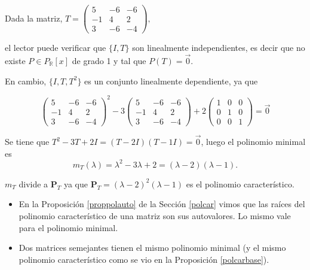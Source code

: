 \bigskip 

\begin{example}

\bigskip 

Dada la matriz, $T=\left(\begin{array}{ccc} 5 & -6 & -6  \\-1  & 4 & 2
\\ 3  & -6 & -4
\end{array}
 \right),$ 
 
 \bigskip 
\noindent
 el lector  puede verificar que $\{I,T\}$ son  linealmente independientes, es decir que  no existe $P\in P_\mathbb{R}\left[x\right]$ de grado 1 y tal que $P(T)=\vec{0}$.
 
  \bigskip 
 
En cambio,  $\{I,T, T^2\}$ es un conjunto linealmente dependiente, ya que 


\begin{equation}
 \left(\begin{array}{ccc} 5 & -6 & -6  \\-1  & 4 & 2
\\ 3  & -6 & -4
\end{array}
 \right) ^2- 3\left(\begin{array}{ccc} 5 & -6 & -6  \\-1  & 4 & 2 \\ 3  & -6 & -4
\end{array}
 \right)+ 2 \left(\begin{array}{ccc} 1 & 0 & 0  \\0  & 1 & 0
\\ 0  & 0 & 1
\end{array}
 \right)=\vec{0}
  \end{equation}
\bigskip  
  

Se tiene que $T^2-3T+2I= (T-2I)(T-1I)=\vec{0}$, luego el polinomio minimal es  $$m_T(\lambda)= \lambda^2-3\lambda+2=(\lambda-2)(\lambda-1).$$

 \noindent
$m_T$  divide a $ \mathbf{P}_T$ ya que    $\mathbf{P}_T=(\lambda-2)^2 (\lambda-1)$ es el polinomio característico.


\end{example}

\bigskip

\begin{remark}
\begin{itemize}

\item
En la Proposición \ref {proppolauto} de la Sección \ref{polcar} vimos que las raíces del polinomio característico de una matriz son sus autovalores. Lo mismo vale para el polinomio minimal.
\item
Dos matrices semejantes tienen el mismo polinomio minimal (y el mismo polinomio característico como  se vio en la Proposición \ref{polcarbase}). 
\end{itemize}
\end{remark}

